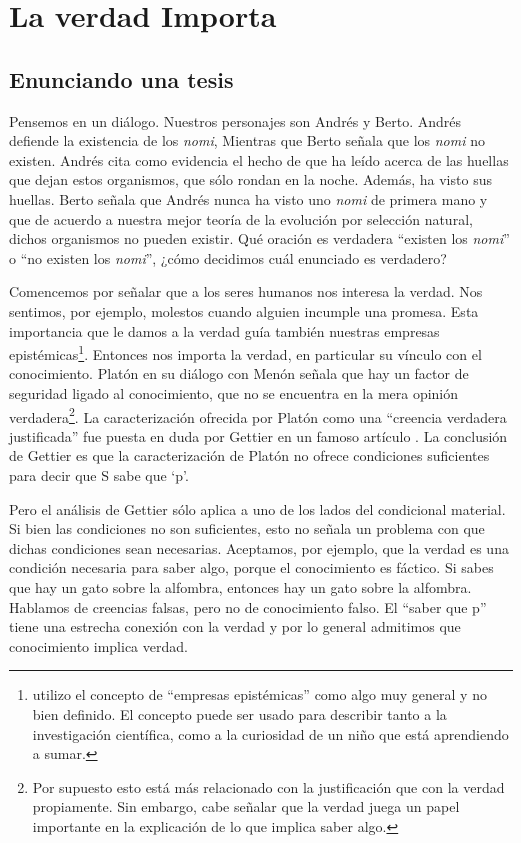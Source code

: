 \documentclass[12pt]{article}
\begin{document}
\section{La verdad Importa}

\subsection{Enunciando una tesis} \label{enunc}

\noindent Pensemos en un diálogo. Nuestros personajes son Andrés y Berto. Andrés defiende la existencia de los \textit{nomi}, Mientras que Berto señala que los \textit{nomi} no existen. Andrés cita como evidencia el hecho de que ha leído acerca de las huellas que dejan estos organismos, que sólo rondan en la noche. Además, ha visto sus huellas. Berto señala que Andrés nunca ha visto uno \textit{nomi} de primera mano y que de acuerdo a nuestra mejor teoría de la evolución por selección natural, dichos organismos no pueden existir. Qué oración es verdadera ``existen los \textit{nomi}'' o ``no existen los \textit{nomi}'', ¿cómo decidimos cuál enunciado es verdadero?

Comencemos por señalar que a los seres humanos nos interesa la verdad. Nos sentimos, por ejemplo, molestos cuando alguien incumple una promesa. Esta importancia que le damos a la verdad guía también nuestras empresas epistémicas\footnote{utilizo el concepto de ``empresas epistémicas'' como algo muy general y no bien definido. El concepto puede ser usado para describir tanto a la investigación científica, como a la curiosidad de un niño que está aprendiendo a sumar.}. Entonces nos importa la verdad, en particular su vínculo con el conocimiento. Platón en su diálogo con Menón \cite[\P\P 97a-98b]{platonmeno} señala que hay un factor de seguridad ligado al conocimiento, que no se encuentra en la mera opinión verdadera\footnote{Por supuesto esto está más relacionado con la justificación que con la verdad propiamente. Sin embargo, cabe señalar que la verdad juega un papel importante en la explicación de lo que implica saber algo.}. La caracterización ofrecida por Platón como una ``creencia verdadera justificada'' fue puesta en duda por Gettier en un famoso artículo \citeyear{Gettier}. La conclusión de Gettier es que la caracterización de Platón no ofrece condiciones suficientes para decir que S sabe que `p'.

Pero el análisis de Gettier sólo aplica a uno de los lados del condicional material. Si bien las condiciones no son suficientes, esto no señala un problema con que dichas condiciones sean necesarias. Aceptamos, por ejemplo, que la verdad es una condición necesaria para saber algo, porque el conocimiento es fáctico. Si sabes que hay un gato sobre la alfombra, entonces hay un gato sobre la alfombra. Hablamos de creencias falsas, pero no de conocimiento falso. El ``saber que p'' tiene una estrecha conexión con la verdad y por lo general admitimos que conocimiento implica verdad.
\end{document}
